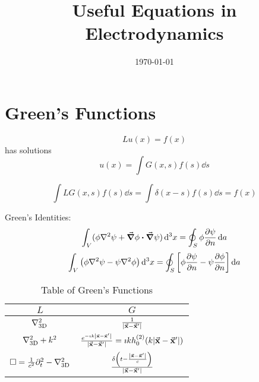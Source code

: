\documentclass[a4paper,twoside]{article}
\title{Useful Equations in Electrodynamics}
\date{\today}
\begin{document}
\maketitle

\section*{Green's Functions}
\begin{equation}
    L u(x) = f(x)
\end{equation}
has solutions
\begin{equation}
    u(x) = \int G(x,s) f(s) \dd{s}
\end{equation}

\begin{equation}
    \int L G(x,s) f(s) \dd{s} = \int \delta(x-s) f(s) \dd{s} = f(x)
\end{equation}

Green's Identities:
\begin{equation}
    \int_{V} (\phi \laplacian{\psi} + \grad{\phi} \vdot \grad{\psi}) \dd[3]{x} = \oint_{S} \phi \pdv{\psi}{n} \dd{a}
\end{equation}
\begin{equation}
    \int_{V} \left( \phi \laplacian{\psi} - \psi \laplacian{\phi} \right) \dd[3]{x} = \oint_{S} \left[ \phi \pdv{\psi}{n} - \psi \pdv{\phi}{n} \right] \dd{a}
\end{equation}

\begin{table}
    \centering
    \begin{tabular}{cc}
        \toprule
        $ L $ & $ G $ \\
        \toprule
        $ \laplacian_{\text{3D}} $ & $ \frac{1}{\abs{ \va{x} - \va{x}'}} $ \\
        \midrule
        $ \laplacian_{\text{3D}} + k^2 $ & $ \frac{e^{- \imath k \abs{ \va{x} - \va{x}'}}}{\abs{\va{x} - \va{x}'}} = \imath k h_0^{(2)}(k \abs{ \va{x} - \va{x}'}) $ \\
        \midrule
        $ \square = \frac{1}{c^2} \partial_t^2 - \laplacian_{\text{3D}} $ & $ \frac{\delta\left( t - \frac{\abs{ \va{x} - \va{x}'}}{c} \right)}{\abs{ \va{x} - \va{x}'}} $ \\
        \bottomrule
    \end{tabular}
    \caption{Table of Green's Functions}
    \label{tab:greens_functions}
\end{table}
\end{document}
